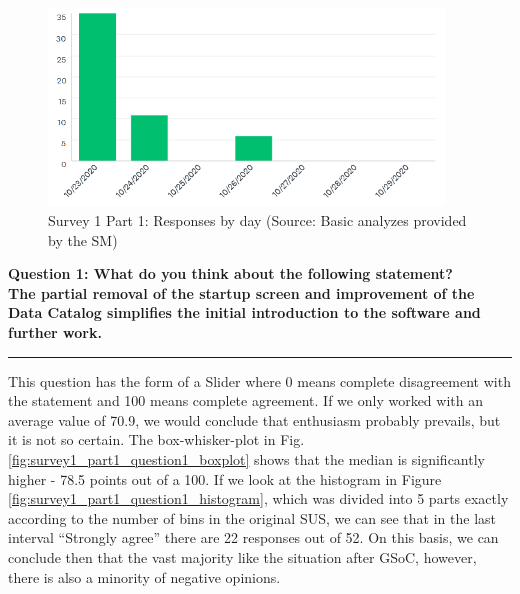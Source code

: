 \documentclass[a4paper,10pt,twoside]{article}
\begin{document}
\begin{figure}[hbt!] 
\begin{center}
\includegraphics[width=10.5cm]{../surveys/analyzed_data/survey1_part1_insight2.png} 
\caption[Survey 1 Part 1: Responses by day]{Survey 1 Part 1: Responses by day (Source: Basic analyzes provided by the SM)}
\label{fig:survey1_part1_insight2}
\end{center}
\end{figure}

\newpage
\noindent \textbf{Question 1: What do you think about the following statement? \\
The partial removal of the startup screen and improvement of the Data Catalog simplifies the initial introduction to the software and further work.}
\par\noindent\rule{\textwidth}{0.4pt}

\noindent This question has the form of a Slider where 0 means complete disagreement with the statement and 100 means complete agreement. If we only worked with an average value of 70.9, we would conclude that enthusiasm probably prevails, but it is not so certain. The box-whisker-plot in Fig. \ref{fig:survey1_part1_question1_boxplot} shows that the median is significantly higher - 78.5 points out of a 100. If we look at the histogram in Figure \ref{fig:survey1_part1_question1_histogram}, which was divided into 5 parts exactly according to the number of bins in the original SUS, we can see that in the last interval ``Strongly agree'' there are 22 responses out of 52. On this basis, we can conclude then that the vast majority like the situation after GSoC, however, there is also a minority of negative opinions.
\end{document}
